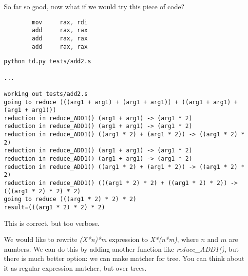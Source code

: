 ﻿\documentclass[12pt]{article}
\begin{document}
So far so good, now what if we would try this piece of code?

\begin{lstlisting}
        mov     rax, rdi
        add     rax, rax
        add     rax, rax
        add     rax, rax
\end{lstlisting}

\begin{lstlisting}
python td.py tests/add2.s

...

working out tests/add2.s
going to reduce (((arg1 + arg1) + (arg1 + arg1)) + ((arg1 + arg1) + (arg1 + arg1)))
reduction in reduce_ADD1() (arg1 + arg1) -> (arg1 * 2)
reduction in reduce_ADD1() (arg1 + arg1) -> (arg1 * 2)
reduction in reduce_ADD1() ((arg1 * 2) + (arg1 * 2)) -> ((arg1 * 2) * 2)
reduction in reduce_ADD1() (arg1 + arg1) -> (arg1 * 2)
reduction in reduce_ADD1() (arg1 + arg1) -> (arg1 * 2)
reduction in reduce_ADD1() ((arg1 * 2) + (arg1 * 2)) -> ((arg1 * 2) * 2)
reduction in reduce_ADD1() (((arg1 * 2) * 2) + ((arg1 * 2) * 2)) -> (((arg1 * 2) * 2) * 2)
going to reduce (((arg1 * 2) * 2) * 2)
result=(((arg1 * 2) * 2) * 2)
\end{lstlisting}

This is correct, but too verbose.

We would like to rewrite \textit{(X*n)*m} expression to \textit{X*(n*m)}, where $n$ and $m$ are numbers.
We can do this by adding another function like \textit{reduce\_ADD1()}, but there is much better option:
we can make matcher for tree.
You can think about it as regular expression matcher, but over trees.
\end{document}
